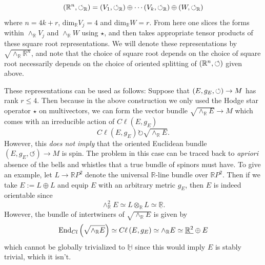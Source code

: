 \documentclass[openany, 11pt]{article}
\theoremstyle{definition}
\theoremstyle{remark}
\def\lp{\ensuremath{\left(}}
\def\rp{\ensuremath{\right)}}
\def\cal{\ensuremath{\boldsymbol{\circlearrowleft}}}
\def\bH{\ensuremath{\mathbb{H}}}
\def\bR{\ensuremath{\mathbb{R}}}
\def\bK{\ensuremath{\mathbb{K}}}
\def\End{\ensuremath{\textnormal{End}}}
\begin{document}
\[
    \lp\bR^n,\cal_{\bR}\rp=\lp V_1,\cal_{\bR}\rp\oplus\cdots\lp V_k,\cal_{\bR}\rp\oplus\lp W,\cal_{\bR}\rp
\]
where $n=4k+r$, $\text{dim}_{\bR} V_j=4$ and $\text{dim}_{\bR} W=r$. From here one slices the forms within $\wedge_{\bR} V_j$ and $\wedge_{\bR}W$ using $\star$, and then takes appropriate tensor products of these square root representations. We will denote these representations by $\sqrt{\wedge_{\bR}\bR^n}$, and note that the choice of square root depends on the choice of square root necessarily depends on the choice of oriented splitting of $\lp\bR^n,\cal\rp$ given above. \par
These representations can be used as follows: Suppose that $\lp E,g_E,\circlearrowleft\rp\rightarrow M$ has rank $r\leq 4$. Then because in the above construction we only used the Hodge star operator $\star$ on multivectors, we can form the vector bundle $\sqrt{\wedge_{\bR}E}\rightarrow M$ which comes with an irreducible action of $C\ell(E,g_E)$
\[
    C\ell(E,g_E)\circlearrowright\sqrt{\wedge_{\bR}E}.
\]
However, this \emph{does not imply} that the oriented Euclidean bundle $(E,g_E,\circlearrowleft)\rightarrow M$ is spin. The problem in this case can be traced back to \emph{apriori} absence of the bells and whistles that a true bundle of spinors must have. To give an example, let $L\rightarrow\bR P^2$ denote the universal $\bR$-line bundle over $\bR P^2$. Then if we take $E:=L\oplus L$ and equip $E$ with an arbitrary metric $g_E$, then $E$ is indeed orientable since
\[
    \wedge^2_{\bR}E\simeq L\otimes_{\bR}L\simeq \underline{\bR}.
\]
However, the bundle of intertwiners of $\sqrt{\wedge_{\bR}E}$ is given by 
\[
    \End_{Cl}\lp\sqrt{\wedge_{\bR}E}\rp\simeq C\ell\lp E,g_E\rp\simeq \wedge_{\bR}E\simeq \underline{\bR^2}\oplus E
\]
which cannot be globally trivialized to $\underline{\bH}$ since this would imply $E$ is stably trivial, which it isn't.
\end{document}
